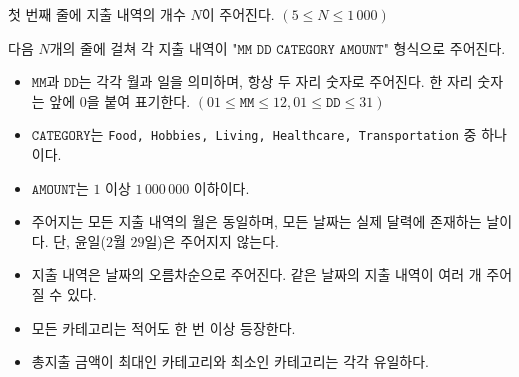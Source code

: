 첫 번째 줄에 지출 내역의 개수 $N$이 주어진다. $(5 \le N \le 1\,000)$

다음 $N$개의 줄에 걸쳐 각 지출 내역이 $\texttt{"MM DD CATEGORY AMOUNT"}$ 형식으로 주어진다.

\begin{itemize}
\item $\texttt{MM}$과 $\texttt{DD}$는 각각 월과 일을 의미하며, 항상 두 자리 숫자로 주어진다. 한 자리 숫자는 앞에 0을 붙여 표기한다. $(01 \le \texttt{MM} \le 12, 01 \le \texttt{DD} \le 31)$ 
\item $\texttt{CATEGORY}$는 \texttt{Food, Hobbies, Living, Healthcare, Transportation} 중 하나이다.
\item $\texttt{AMOUNT}$는 $1$ 이상 $1\,000\,000$ 이하이다.
\item 주어지는 모든 지출 내역의 월은 동일하며, 모든 날짜는 실제 달력에 존재하는 날이다. 단, 윤일($2$월 $29$일)은 주어지지 않는다.
\item 지출 내역은 날짜의 오름차순으로 주어진다. 같은 날짜의 지출 내역이 여러 개 주어질 수 있다.
\item 모든 카테고리는 적어도 한 번 이상 등장한다.
\item 총지출 금액이 최대인 카테고리와 최소인 카테고리는 각각 유일하다.
\end{itemize}

